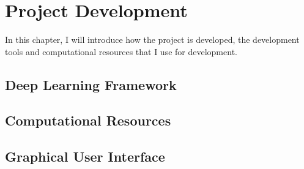 \chapter{Project Development}
In this chapter, I will introduce how the project is developed,
the development tools and computational resources that I use for 
development.

\section{Deep Learning Framework}
\section{Computational Resources}
\section{Graphical User Interface}

